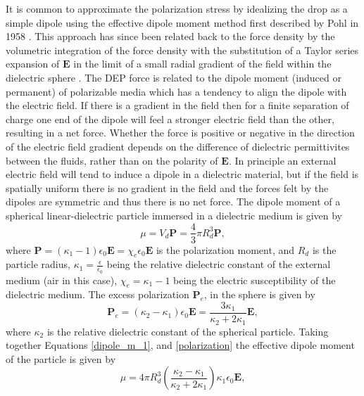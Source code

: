 \documentclass[12pt,a4paper,oneside]{book}
\begin{document}
It is common to approximate the polarization stress by idealizing the drop as a simple dipole using the effective dipole moment method first described by Pohl in 1958 \cite{pohl_effects_1958}. This approach has since been related back to the force density by the volumetric integration of the force density with the substitution of a Taylor series expansion of $\mathbf{E}$ in the limit of a small radial gradient of the field within the dielectric sphere \cite{wang_general_1997}. The DEP force is related to the dipole moment (induced or permanent) of polarizable media which has a tendency to align the dipole with the electric field. If there is a gradient in the field then for a finite separation of charge one end of the dipole will feel a stronger electric field than the other, resulting in a net force. Whether the force is positive or negative in the direction of the electric field gradient depends on the difference of dielectric permittivites between the fluids, rather than on the polarity of $\mathbf{E}$. In principle an external electric field will tend to induce a dipole in a dielectric material, but if the field is spatially uniform there is no gradient in the field and the forces felt by the dipoles are symmetric and thus there is no net force. The dipole moment of a spherical linear-dielectric particle immersed in a dielectric medium is given by
\begin{equation} \label{dipole_m_1}
\mu = V_d \mathbf{P} = \frac{4}{3} \pi R_d^3 \mathbf{P},
\end{equation} 
where $\mathbf{P} = \left(\kappa_1 - 1 \right) \epsilon_0 \mathbf{E} = \chi_e \epsilon_0 \mathbf{E}$ is the polarization moment, and $R_d$ is the particle radius, $\kappa_1 = \frac{\epsilon}{\epsilon_0}$ being the relative dielectric constant of the external medium (air in this case), $\chi_e = \kappa_1 - 1$ being the electric susceptibility of the dielectric medium. The excess polarization $\mathbf{P}_e$, in the sphere is given by
\begin{equation} \label{polarization}
\mathbf{P}_e = \left( \kappa_2 - \kappa_1 \right) \epsilon_0 \mathbf{E} = \frac{3 \kappa_1}{\kappa_2 +2\kappa_1}\mathbf{E},
\end{equation}
where $\kappa_2$ is the relative dielectric constant of the spherical particle. Taking together Equations \ref{dipole_m_1}, and \ref{polarization} the effective dipole moment of the particle is given by 
\begin{equation}\label{dipole_m_2}
\mu = 4 \pi R_d^3 \left( \frac{\kappa_2 - \kappa_1}{\kappa_2 + 2 \kappa_1} \right) \kappa_1 \epsilon_0 \mathbf{E},
\end{equation}
\end{document}
